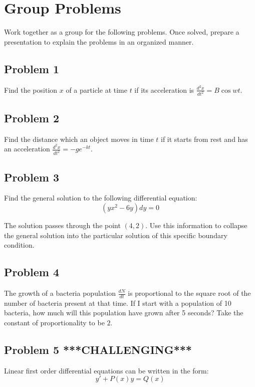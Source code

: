 \documentclass{article}
\begin{document}
  
  \clearpage
  \section{Group Problems}
  Work together as a group for the following problems. Once solved, prepare a presentation to explain the problems in an organized manner.
  \subsection{Problem 1}
  Find the position $x$ of a particle at time $t$ if its acceleration is $\frac{d^2x}{dt^2}=B\cos{wt}$.
  
  \subsection{Problem 2}
  Find the distance which an object moves in time $t$ if it starts from rest and has an acceleration $\frac{d^2x}{dt^2}=-ge^{-kt}$.
 
  \subsection{Problem 3}
  Find the general solution to the following differential equation:
  \begin{equation}
      (yx^2-6y)dy=0
  \end{equation}
  
  The solution passes through the point $(4,2)$. Use this information to collapse the general solution into the particular solution of this specific boundary condition.
  
  \subsection{Problem 4}
  The growth of a bacteria population $\frac{dN}{dt}$ is proportional to the square root of the number of bacteria present at that time. If I start with a population of 10 bacteria, how much will this population have grown after 5 seconds? Take the constant of proportionality to be $2$.
  
  \subsection{Problem 5 ***CHALLENGING***}
  Linear first order differential equations can be written in the form:
  \begin{equation}
      y'+P(x)y=Q(x)
  \end{equation}
  
\end{document}

